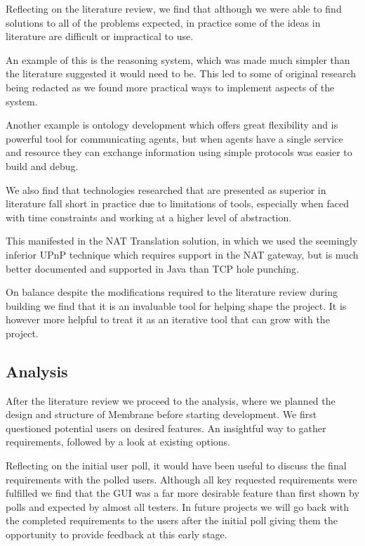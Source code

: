 \documentclass[11pt, a4paper, twoside]{report}
\begin{document}
Reflecting on the literature review, we find that although we were able to find solutions to all of the problems expected, in practice some of the ideas in literature are difficult or impractical to use.

An example of this is the reasoning system, which was made much simpler than the literature suggested it would need to be. This led to some of original research being redacted as we found more practical ways to implement aspects of the system.

Another example is ontology development which offers great flexibility and is powerful tool for communicating agents, but when agents have a single service and resource they can exchange information using simple protocols was easier to build and debug.

We also find that technologies researched that are presented as superior in literature fall short in practice due to limitations of tools, especially when faced with time constraints and working at a higher level of abstraction.

This manifested in the NAT Translation solution, in which we used the seemingly inferior  UPnP technique which requires support in the NAT gateway, but is much better documented and supported in Java than TCP hole punching. 

On balance despite the modifications required to the literature review during building we find that it is an invaluable tool for helping shape the project. It is however more helpful to treat it as an iterative tool that can grow with the project.

\subsection{Analysis}

After the literature review we proceed to the analysis, where we planned the design and structure of Membrane before starting development. We first questioned potential users on desired features. An insightful way to gather requirements, followed by a look at existing options.

Reflecting on the initial user poll, it would have been useful to discuss the final requirements with the polled users. Although all key requested requirements were fulfilled we find that the GUI was a far more desirable feature than first shown by polls and expected by almost all testers. In future projects we will go back with the completed requirements to the users after the initial poll giving them the opportunity to provide feedback at this early stage.
\end{document}
